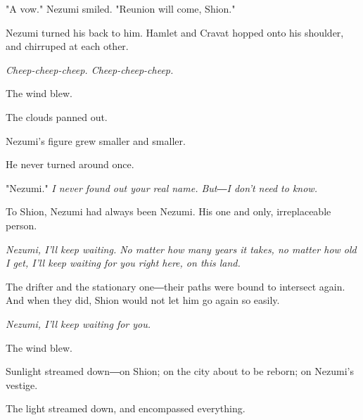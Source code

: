 "A vow." Nezumi smiled. "Reunion will come, Shion."

Nezumi turned his back to him. Hamlet and Cravat hopped onto his
shoulder, and chirruped at each other.

\emph{Cheep-cheep-cheep. Cheep-cheep-cheep.}

The wind blew.

The clouds panned out.

Nezumi's figure grew smaller and smaller.

He never turned around once.

"Nezumi." \emph{I never found out your real name. But―I don't need to know.}

To Shion, Nezumi had always been Nezumi. His one and only, irreplaceable
person.

\emph{Nezumi, I'll keep waiting. No matter how many years it takes, no matter
how old I get, I'll keep waiting for you right here, on this land.}

The drifter and the stationary one―their paths were bound to intersect
again. And when they did, Shion would not let him go again so easily.

\emph{Nezumi, I'll keep waiting for you.}

\myspace

The wind blew.

Sunlight streamed down―on Shion; on the city about to be reborn; on
Nezumi's vestige.

The light streamed down, and encompassed everything.